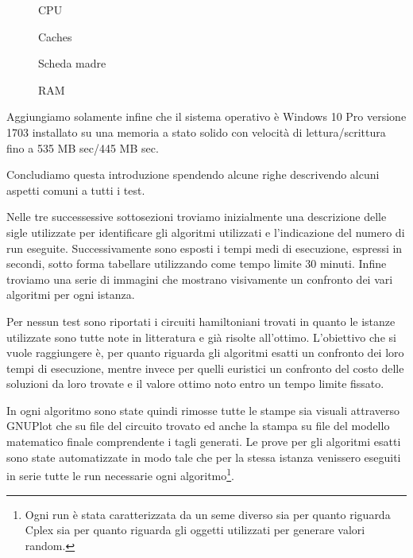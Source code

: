 \documentclass[11pt]{article}
\begin{document}
\begin{figure}[htbp]
    \centering
    \caption{CPU}
\end{figure}

\begin{figure}[htbp]
    \centering
    \caption{Caches}
\end{figure}

\begin{figure}[htbp]
    \centering
    \caption{Scheda madre}
\end{figure}

\begin{figure}[htbp]
    \centering
    \caption{RAM}
\end{figure}


Aggiungiamo solamente infine che il sistema operativo è Windows 10 Pro versione 1703 installato su una memoria a stato solido con velocità di lettura/scrittura fino a 535 MB sec/445 MB sec.

Concludiamo questa introduzione spendendo alcune righe descrivendo alcuni aspetti comuni a tutti i test.

Nelle tre successessive sottosezioni troviamo inizialmente una descrizione delle sigle utilizzate per identificare gli algoritmi utilizzati e l'indicazione del numero di run eseguite. Successivamente sono esposti i tempi medi di esecuzione, espressi in secondi, sotto forma tabellare utilizzando come tempo limite $30$ minuti. Infine troviamo una serie di immagini che mostrano visivamente un confronto dei vari algoritmi per ogni istanza.

Per nessun test sono riportati i circuiti hamiltoniani trovati in quanto le istanze utilizzate sono tutte note in litteratura e già risolte all'ottimo. L'obiettivo che si vuole raggiungere è, per quanto riguarda gli algoritmi esatti un confronto dei loro tempi di esecuzione, mentre invece per quelli euristici un confronto del costo delle soluzioni da loro trovate e il valore ottimo noto entro un tempo limite fissato.

In ogni algoritmo sono state quindi rimosse tutte le stampe sia visuali attraverso GNUPlot che su file del circuito trovato ed anche la stampa su file del modello matematico finale comprendente i tagli generati. Le prove per gli algoritmi esatti sono state automatizzate in modo tale che per la stessa istanza venissero eseguiti in serie tutte le run necessarie ogni algoritmo\footnote{Ogni run è stata caratterizzata da un seme diverso sia per quanto riguarda Cplex sia per quanto riguarda gli oggetti utilizzati per generare valori random.}.
\end{document}
